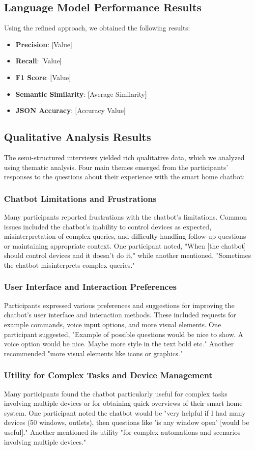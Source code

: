 \subsection{Language Model Performance Results}
Using the refined approach, we obtained the following results:
\begin{itemize}
    \item \textbf{Precision}: [Value]
    \item \textbf{Recall}: [Value]
    \item \textbf{F1 Score}: [Value]
    \item \textbf{Semantic Similarity}: [Average Similarity]
    \item \textbf{JSON Accuracy}: [Accuracy Value]
\end{itemize}

\subsection{Qualitative Analysis Results}
The semi-structured interviews yielded rich qualitative data, which we analyzed using thematic analysis. Four main themes emerged from the participants' responses to the questions about their experience with the smart home chatbot:
\subsubsection{Chatbot Limitations and Frustrations}
Many participants reported frustrations with the chatbot's limitations. Common issues included the chatbot's inability to control devices as expected, misinterpretation of complex queries, and difficulty handling follow-up questions or maintaining appropriate context. One participant noted, "When [the chatbot] should control devices and it doesn't do it," while another mentioned, "Sometimes the chatbot misinterprets complex queries."
\subsubsection{User Interface and Interaction Preferences}
Participants expressed various preferences and suggestions for improving the chatbot's user interface and interaction methods. These included requests for example commands, voice input options, and more visual elements. One participant suggested, "Example of possible questions would be nice to show. A voice option would be nice. Maybe more style in the text bold etc." Another recommended "more visual elements like icons or graphics."
\subsubsection{Utility for Complex Tasks and Device Management}
Many participants found the chatbot particularly useful for complex tasks involving multiple devices or for obtaining quick overviews of their smart home system. One participant noted the chatbot would be "very helpful if I had many devices (50 windows, outlets), then questions like 'is any window open' [would be useful]." Another mentioned its utility "for complex automations and scenarios involving multiple devices."

